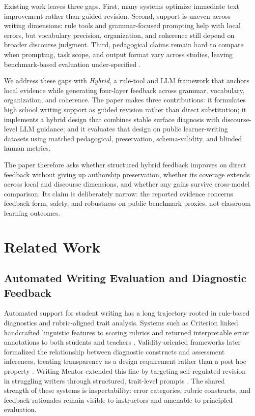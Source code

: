 \documentclass[preprint,12pt]{elsarticle}
\begin{document}
Existing work leaves three gaps. First, many systems optimize immediate text improvement rather than guided revision. Second, support is uneven across writing dimensions: rule tools and grammar-focused prompting help with local errors, but vocabulary precision, organization, and coherence still depend on broader discourse judgment. Third, pedagogical claims remain hard to compare when prompting, task scope, and output format vary across studies, leaving benchmark-based evaluation under-specified \cite{ye2025position,jaganov2025dynamic}.

We address these gaps with \textit{Hybrid}, a rule-tool and LLM framework that anchors local evidence while generating four-layer feedback across grammar, vocabulary, organization, and coherence. The paper makes three contributions: it formulates high school writing support as guided revision rather than direct substitution; it implements a hybrid design that combines stable surface diagnosis with discourse-level LLM guidance; and it evaluates that design on public learner-writing datasets using matched pedagogical, preservation, schema-validity, and blinded human metrics.

The paper therefore asks whether structured hybrid feedback improves on direct feedback without giving up authorship preservation, whether its coverage extends across local and discourse dimensions, and whether any gains survive cross-model comparison. Its claim is deliberately narrow: the reported evidence concerns feedback form, safety, and robustness on public benchmark proxies, not classroom learning outcomes.

\section{Related Work}

\subsection{Automated Writing Evaluation and Diagnostic Feedback}

Automated support for student writing has a long trajectory rooted in rule-based diagnostics and rubric-aligned trait analysis. Systems such as Criterion linked handcrafted linguistic features to scoring rubrics and returned interpretable error annotations to both students and teachers \cite{burstein2004criterion}. Validity-oriented frameworks later formalized the relationship between diagnostic constructs and assessment inferences, treating transparency as a design requirement rather than a post hoc property \cite{chapelle2015validity,weigle2002assessing}. Writing Mentor extended this line by targeting self-regulated revision in struggling writers through structured, trait-level prompts \cite{madnani2018writing}. The shared strength of these systems is inspectability: error categories, rubric constructs, and feedback rationales remain visible to instructors and amenable to principled evaluation.
\end{document}
